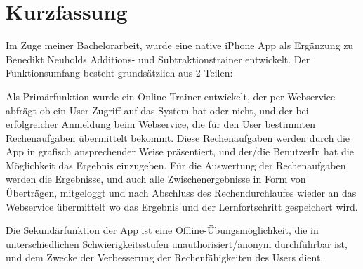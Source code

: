 

\chapter*{Kurzfassung}
\label{cha:abstract}



Im Zuge meiner Bachelorarbeit, wurde eine native iPhone App als Ergänzung
zu Benedikt Neuholds Additions- und Subtraktionstrainer entwickelt. 
Der Funktionsumfang besteht grundsätzlich aus 2 Teilen: 

Als Primärfunktion wurde ein Online-Trainer entwickelt, der per Webservice abfrägt 
ob ein User Zugriff auf das System hat oder nicht, und der bei erfolgreicher Anmeldung beim 
Webservice, die für den User bestimmten Rechenaufgaben übermittelt bekommt.
Diese Rechenaufgaben werden durch die App in grafisch ansprechender Weise präsentiert,
und der/die BenutzerIn hat die Möglichkeit das Ergebnis einzugeben.
Für die Auswertung der Rechenaufgaben werden die Ergebnisse, und auch alle Zwischenergebnisse 
in Form von Überträgen, mitgeloggt und nach Abschluss des Rechendurchlaufes wieder 
an das Webservice übermittelt wo das Ergebnis und der Lernfortschritt gespeichert wird.

Die Sekundärfunktion der App ist eine Offline-Übungsmöglichkeit, die in unterschiedlichen 
Schwierigkeitsstufen unauthorisiert/anonym durchführbar ist, und dem Zwecke der Verbesserung
der Rechenfähigkeiten des Users dient. 



